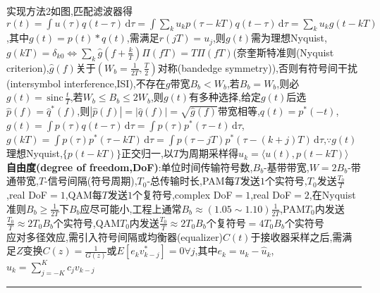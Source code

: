 \documentclass[UTF8,a4paper,10pt]{article}
\providecommand{\abs}[1]{\left\lvert#1\right\rvert}
\providecommand{\re}{\,\mathrm{Re}\,}
\providecommand{\sinc}{\,\mathrm{sinc}\,}
\begin{document}
\begin{multicols*}{2}
    实现方法2如图,匹配滤波器得$r(t)=\int u(\tau)q(t-\tau)\,\mathrm{d}\tau=\int\sum_ku_kp(\tau-kT)q(t-\tau)\,\mathrm{d}\tau=\sum_ku_kg(t-kT)$,其中$g(t)=p(t)*q(t)$,需满足$r(jT)=u_j$,则$g(t)$需为理想Nyquist,$g(kT)=\delta_{k0}\Leftrightarrow\sum_k\hat{g}(f+\frac{k}{T})\Pi(fT)=T\Pi(fT)$(奈奎斯特准则(Nyquist criterion),$\hat{g}(f)$关于$(W_b=\frac{1}{2T},\frac{T}{2})$对称(bandedge symmetry)),否则有符号间干扰(intersymbol interference,ISI),不存在$g$带宽$B_b<W_b$,若$B_b=W_b$,则必$g(t)=\sinc\frac{t}{T}$,若$W_b\leq B_b\leq 2W_b$,则$g(t)$有多种选择,给定$g(t)$后选$\hat{p}(f)=\hat{q}^*(f)$,则$\abs{\hat{p}(f)}=\abs{\hat{q}(f)}=\sqrt{\hat{g}(f)}$带宽相等,$q(t)=p^*(-t)$,$g(t)=\int p(\tau)q(t-\tau)\,\mathrm{d}\tau=\int p(\tau)p^*(\tau-t)\,\mathrm{d}\tau$,$g(kT)=\int p(\tau)p^*(\tau-kT)\,\mathrm{d}\tau=\int p(\tau-jT)p^*(\tau-(k+j)T)\,\mathrm{d}\tau$,$\because g(t)$理想Nyquist,$\{p(t-kT)\}$正交归一,以$T$为周期采样得$u_k=\langle u(t),p(t-kT)\rangle$\\
\textbf{自由度(degree of freedom,DoF)}:单位时间传输符号数,$B_b$-基带带宽,$W=2B_b$-带通带宽,$T$-信号间隔(符号周期),$T_0$-总传输时长,PAM每$T$发送$1$个实符号,$T_0$发送$\frac{T_0}{T}$,real DoF$=1$,QAM每$T$发送$1$个复符号,complex DoF$=1$,real DoF$=2$,在Nyquist准则$B_b\geq\frac{1}{2T}$下$B_b$应尽可能小,工程上通常$B_b\approx(1.05\sim 1.10)\frac{1}{2T}$,PAM$T_0$内发送$\frac{T_0}{T}\approx 2T_0B_b$个实符号,QAM$T_0$内发送$\frac{T_0}{T}\approx 2T_0B_b$个复符号$=4T_0B_b$个实符号\\
应对多径效应,需引入符号间隔或均衡器(equalizer)$C(t)$于接收器采样之后,需满足$Z$变换$C(z)=\frac{1}{G(z)}$或$E[e_kv_{k-j}^*]=0\forall j$,其中$e_k=u_k-\hat{u}_k$,$\hat{u}_k=\sum_{j=-K}^Kc_jv_{k-j}$\\
\rule{\columnwidth}{.2pt}\\
\\
\end{multicols*}
\end{document}
